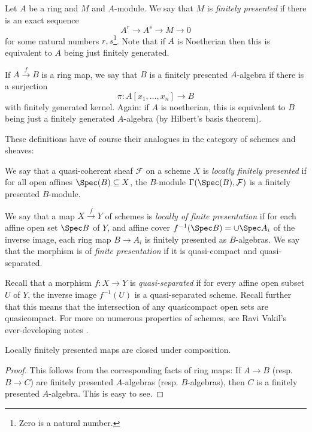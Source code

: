 \documentclass[11pt, english]{article}
\begin{document}
\begin{defi}
Let $A$ be a ring and $M$ and $A$-module. We say that $M$ is \emph{finitely presented} if there is an exact sequence
\[
A^r \to A^s \to M \to 0
\]
for some natural numbers $r,s$\footnote{Zero is a natural number.}. Note that if $A$ is Noetherian then this is equivalent to $A$ being just finitely generated.

If $A \xrightarrow{f} B$ is a ring map, we say that $B$ is a finitely presented $A$-algebra if there is a surjection
\[
\pi: A[x_1, \dotsc, x_n] \to B
\]
with finitely generated kernel. Again: if $A$ is noetherian, this is equivalent to $B$ being just a finitely generated $A$-algebra (by Hilbert's basis theorem).
\end{defi}

These definitions have of course their analogues in the category of schemes and sheaves:

\begin{defi}
We say that a quasi-coherent sheaf $\mathcal F$ on a scheme $X$ is \emph{locally finitely presented} if for all open affines $\Spec(B) \subseteq X$, the $B$-module $\Gamma(\Spec(B),\mathcal F)$ is a finitely presented $B$-module.

We say that a map $X \xrightarrow{f} Y$ of schemes is \emph{locally of finite presentation} if for each affine open set $\Spec B$ of $Y$, and affine cover $f^{-1}(\Spec B)=\cup \Spec A_i$ of the inverse image, each ring map $B \to A_i$ is finitely presented as $B$-algebras. We say that the morphism is of \emph{finite presentation} if it is quasi-compact and quasi-separated.
\end{defi}

\begin{remark}
Recall that a morphism $f:X \to Y$ is \emph{quasi-separated} if for every affine open subset $U$ of $Y$, the inverse image $f^{-1}(U)$ is a quasi-separated scheme. Recall further that this means that the intersection of any quasicompact open sets are quasicompact. For more on numerous properties of schemes, see Ravi Vakil's ever-developing notes \cite{ravi_vakil}.    
\end{remark}

\begin{lemma}
Locally finitely presented maps are closed under composition.
\end{lemma}
\begin{proof}
This follows from the corresponding facts of ring maps: If $A \to B$ (resp. $B \to C$) are finitely presented $A$-algebras (resp. $B$-algebras), then $C$ is a finitely presented $A$-algebra. This is easy to see.
\end{proof}
\end{document}
